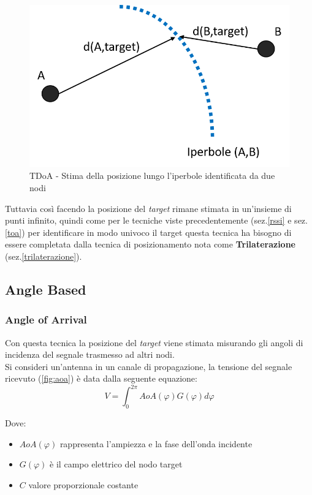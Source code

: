\begin{figure}[H]  
	\centering 
	\includegraphics[scale=0.4]{ContestoApplicativo/tdoa1.png}
	\caption{TDoA - Stima della posizione lungo l'iperbole identificata da due nodi}
	\label{fig:tdoa1}
\end{figure}

	Tuttavia così facendo la posizione del \textit{target} rimane stimata in un'insieme di punti infinito, quindi come per le tecniche viste precedentemente (sez.\ref{rssi} e sez.\ref{toa}) per identificare in modo univoco il target questa tecnica ha bisogno di essere completata dalla tecnica di posizionamento nota come \textbf{Trilaterazione} (sez.\ref{trilaterazione}).

\subsection{Angle Based}
\label{angle}
\subsubsection{Angle of Arrival}
\label{aoa}
Con questa tecnica la posizione del \textit{target} viene stimata misurando gli angoli di incidenza del segnale trasmesso ad altri nodi.\\
Si consideri \cite{aoa} un'antenna in un canale di propagazione, la tensione del segnale ricevuto (\ref{fig:aoa}) è data dalla seguente equazione:\\
\begin{equation}
 V = \int_{0}^{2\pi} AoA(\varphi) G(\varphi)d\varphi 
\end{equation}

Dove:
\begin{itemize}
	\item $AoA(\varphi)$ rappresenta l'ampiezza e la fase dell'onda incidente
	\item $G(\varphi)$ è il campo elettrico del nodo target 
	\item $C$ valore proporzionale costante
\end{itemize}

